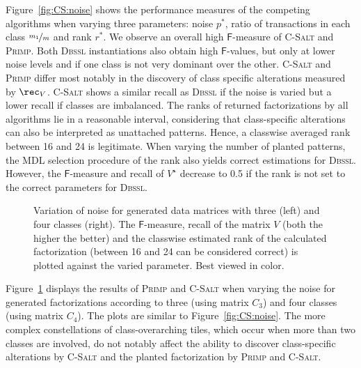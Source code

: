Figure~\ref{fig:CS:noise} shows the performance measures of the competing algorithms when varying three parameters: noise $p^*$, ratio of transactions in each class $\nicefrac{m_1}{m}$ and rank $r^*$.
We observe an overall high $\mathsf{F}$-measure of \textsc{C-Salt} and \textsc{Primp}.
Both \textsc{Dbssl} instantiations also obtain high $\mathsf{F}$-values, but only at lower noise levels and if one class is not very dominant over the other.
\textsc{C-Salt} and \textsc{Primp} differ most notably in the discovery of class specific alterations measured by $\rec_V$. \textsc{C-Salt} shows a similar recall as \textsc{Dbssl} if the noise is varied but a lower recall if classes are imbalanced. The ranks of returned factorizations by all algorithms lie in a reasonable interval, considering that class-specific alterations can also be interpreted as unattached patterns. Hence, a classwise averaged rank between 16 and 24 is legitimate. When varying the number of planted patterns, the MDL selection procedure of the rank also yields correct estimations for \textsc{Dbssl}. However, the $\mathsf{F}$-measure and recall of $V^\star$ decrease to 0.5 if the rank is not set to the correct parameters for \textsc{Dbssl}.

\begin{figure}[!t]
\centering

\caption{Variation of noise for generated data matrices with three (left) and four classes (right). The $\mathsf{F}$-measure, recall of the matrix $V$ (both the higher the better) and the classwise estimated rank of the calculated factorization (between 16 and 24 can be considered correct) is plotted against the varied parameter. Best viewed in color.}
\label{fig:synthClass}
\end{figure}
Figure~\ref{fig:synthClass} displays the results of \textsc{Primp} and \textsc{C-Salt} when varying the noise for generated factorizations according to three (using matrix $C_3$) and four classes (using matrix $C_4$). The plots are similar to Figure~\ref{fig:CS:noise}. The more complex constellations of class-overarching tiles, which occur when more than two classes are involved, do not notably affect the ability to discover class-specific alterations by \textsc{C-Salt} and the planted factorization by \textsc{Primp} and \textsc{C-Salt}.

